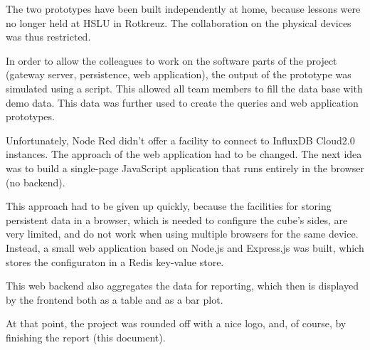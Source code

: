 The two prototypes have been built independently at home, because lessons were no longer held at HSLU in Rotkreuz. The collaboration on the physical devices was thus restricted.

In order to allow the colleagues to work on the software parts of the project (gateway server, persistence, web application), the output of the prototype was simulated using a script. This allowed all team members to fill the data base with demo data. This data was further used to create the queries and web application prototypes.

Unfortunately, Node Red didn't offer a facility to connect to InfluxDB Cloud2.0 instances. The approach of the web application had to be changed. The next idea was to build a single-page JavaScript application that runs entirely in the browser (no backend).

This approach had to be given up quickly, because the facilities for storing persistent data in a browser, which is needed to configure the cube's sides, are very limited, and do not work when using multiple browsers for the same device. Instead, a small web application based on Node.js and Express.js was built, which stores the configuraton in a Redis key-value store.

This web backend also aggregates the data for reporting, which then is displayed by the frontend both as a table and as a bar plot.

At that point, the project was rounded off with a nice logo, and, of course, by finishing the report (this document).
